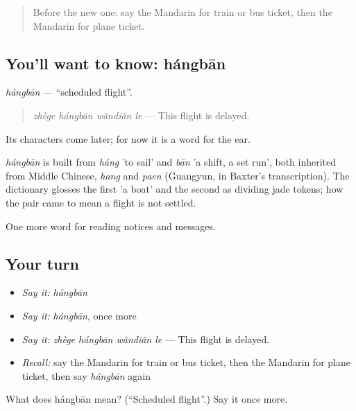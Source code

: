 \label{lesson:ZH-C196-hangban}



\begin{quote}
Before the new one: say the Mandarin for train or bus ticket, then the Mandarin for plane ticket.
\end{quote}

\subsection*{You'll want to know: hángbān}
\emph{hángbān} — \textquotedblleft{}scheduled flight\textquotedblright{}.

\begin{quote}
\emph{zhège hángbān wǎndiǎn le} — This flight is delayed.
\end{quote}

Its characters come later; for now it is a word for the ear.

\begin{cousinweb}
\emph{hángbān} is built from \emph{háng} 'to sail' and \emph{bān} 'a shift, a set run', both inherited from Middle Chinese, \emph{hang} and \emph{paen} (Guangyun, in Baxter's transcription). The dictionary glosses the first 'a boat' and the second as dividing jade tokens; how the pair came to mean a flight is not settled.
\end{cousinweb}

\begin{grammarlens}[title={What you've built}]
One more word for reading notices and messages.
\end{grammarlens}

\subsection*{Your turn}
\begin{itemize}
\raggedright
  \item \emph{Say it:} \emph{hángbān}
  \item \emph{Say it:} \emph{hángbān}, once more
  \item \emph{Say it:} \emph{zhège hángbān wǎndiǎn le} — This flight is delayed.
  \item \emph{Recall:} say the Mandarin for train or bus ticket, then the Mandarin for plane ticket, then say \emph{hángbān} again
\end{itemize}

\begin{tcolorbox}[breakable,colback=teal!4,colframe=teal!35!black,title={Before you move on}]
What does hángbān mean? (\textquotedblleft{}Scheduled flight\textquotedblright{}.) Say it once more.
\end{tcolorbox}
